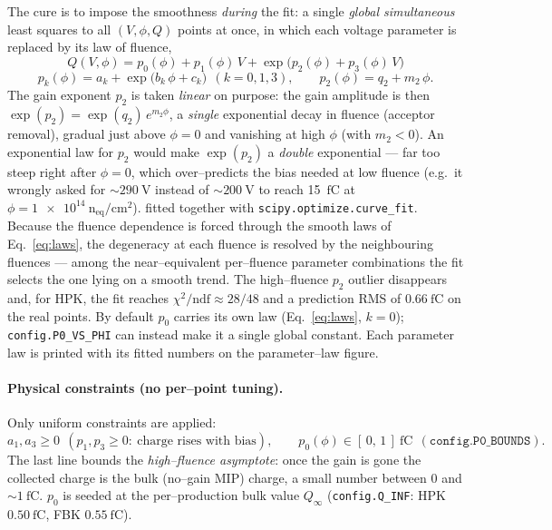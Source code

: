 \documentclass[11pt]{article}
\newcommand{\neqcm}{\ensuremath{\mathrm{n_{eq}/cm^{2}}}}
\newcommand{\fC}{\ensuremath{\mathrm{fC}}}
\newcommand{\code}[1]{\texttt{#1}}
\begin{document}
The cure is to impose the smoothness \emph{during} the fit: a single
\emph{global simultaneous} least squares to all $(V,\phi,Q)$ points at once, in
which each voltage parameter is replaced by its law of fluence,
\begin{equation}
  \boxed{\,Q(V,\phi) = p_0(\phi) + p_1(\phi)\,V +
          \exp\!\big(p_2(\phi) + p_3(\phi)\,V\big)\,}
  \label{eq:global}
\end{equation}
\begin{equation}
  p_k(\phi) = a_k + \exp\!\big(b_k\,\phi + c_k\big)\ \ (k=0,1,3),\qquad
  p_2(\phi) = q_2 + m_2\,\phi .
  \label{eq:laws}
\end{equation}
The gain exponent $p_2$ is taken \emph{linear} on purpose: the gain amplitude is
then $\exp(p_2)=\exp(q_2)\,e^{m_2\phi}$, a \emph{single} exponential decay in
fluence (acceptor removal), gradual just above $\phi=0$ and vanishing at high
$\phi$ (with $m_2<0$). An exponential law for $p_2$ would make $\exp(p_2)$ a
\emph{double} exponential --- far too steep right after $\phi=0$, which
over--predicts the bias needed at low fluence (e.g.\ it wrongly asked for
${\sim}\SI{290}{\volt}$ instead of ${\sim}\SI{200}{\volt}$ to reach
\SI{15}{\fC} at $\phi=\SI{1e14}{\neqcm}$).
fitted together with \code{scipy.optimize.curve\_fit}. Because the fluence
dependence is forced through the smooth laws of Eq.~\ref{eq:laws}, the degeneracy
at each fluence is resolved by the neighbouring fluences --- among the
near--equivalent per--fluence parameter combinations the fit selects the one lying
on a smooth trend. The high--fluence $p_2$ outlier disappears and, for HPK, the fit
reaches $\chi^2/\mathrm{ndf}\approx 28/48$ and a prediction RMS of $\SI{0.66}{\fC}$
on the real points. By default $p_0$ carries its own law (Eq.~\ref{eq:laws},
$k=0$); \code{config.P0\_VS\_PHI} can instead make it a single global constant.
Each parameter law is printed with its fitted numbers on the parameter--law figure.

\paragraph{Physical constraints (no per--point tuning).} Only uniform constraints
are applied:
\begin{equation}
  a_1,a_3\ge 0 \ \ (p_1,p_3\ge0:\ \text{charge rises with bias}),\qquad
  p_0(\phi)\in[\,0,\,1\,]\ \fC\ \ (\code{config.P0\_BOUNDS}).
\end{equation}
The last line bounds the \emph{high--fluence asymptote}: once the gain is gone the
collected charge is the bulk (no--gain MIP) charge, a small number between $0$ and
$\sim\SI{1}{\fC}$. $p_0$ is seeded at the per--production bulk value
$Q_\infty$ (\code{config.Q\_INF}: HPK $\SI{0.50}{\fC}$, FBK $\SI{0.55}{\fC}$).
\end{document}
